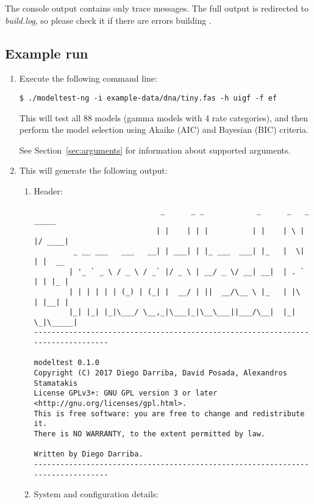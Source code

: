 The console output contains only trace messages.
The full output is redirected to {\em build.log}, so please check it if there are errors building \modeltest.
\subsection{Example run}

\begin{enumerate}
\item Execute the following command line:

\begin{lstlisting}
$ ./modeltest-ng -i example-data/dna/tiny.fas -h uigf -f ef
\end{lstlisting}

This will test all 88 models (gamma models with 4 rate categories), and then perform the model selection using Akaike (AIC) and Bayesian (BIC) criteria.

See Section~\ref{sec:arguments} for information about supported arguments.

\item This will generate the following output:

\begin{enumerate}

\item Header:

\begin{lstlisting}
                             _      _ _            _      _   _  _____ 
                            | |    | | |          | |    | \ | |/ ____|
         _ __ ___   ___   __| | ___| | |_ ___  ___| |_   |  \| | |  __ 
        | '_ ` _ \ / _ \ / _` |/ _ \ | __/ _ \/ __| __|  | . ` | | |_ |
        | | | | | | (_) | (_| |  __/ | ||  __/\__ \ |_   | |\  | |__| |
        |_| |_| |_|\___/ \__,_|\___|_|\__\___||___/\__|  |_| \_|\_____|
--------------------------------------------------------------------------------

modeltest 0.1.0
Copyright (C) 2017 Diego Darriba, David Posada, Alexandros Stamatakis
License GPLv3+: GNU GPL version 3 or later <http://gnu.org/licenses/gpl.html>.
This is free software: you are free to change and redistribute it.
There is NO WARRANTY, to the extent permitted by law.

Written by Diego Darriba.
--------------------------------------------------------------------------------
\end{lstlisting}

\item System and configuration details:


\end{enumerate}
\end{enumerate}
